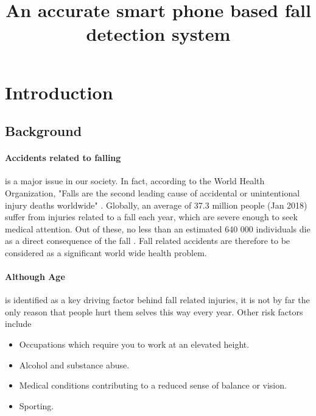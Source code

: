 \documentclass[12pt, a4paper, onecolumn]{article}
\begin{document}
	
	\title{An accurate smart phone based fall detection system}
	\maketitle

	\tableofcontents
	\newpage
	
	\section{Introduction}
	
		\subsection{Background}
		
		\paragraph{Accidents related to falling} is a major issue in our society. In fact, according to the World Health Organization, "Falls are the second leading cause of accidental or unintentional injury deaths worldwide" \cite{who}. Globally, an average of 37.3 million people (Jan 2018) suffer from injuries related to a fall each year, which are severe enough to seek medical attention. Out of these, no less than an estimated 640 000 individuals die as a direct consequence of the fall \cite{who}. Fall  related accidents are therefore to be considered as a significant world wide health problem. 
		
		\paragraph{Although Age} is identified as a key driving factor behind fall related injuries, it is not by far the only reason that people hurt them selves this way every year.  Other risk factors include 
		\begin{itemize}
			\item Occupations which require you to work at an elevated height.
			\item Alcohol and substance abuse.
			\item Medical conditions contributing to a reduced sense of balance or vision.
			\item Sporting.	
		\end{itemize}
		
\end{document}
